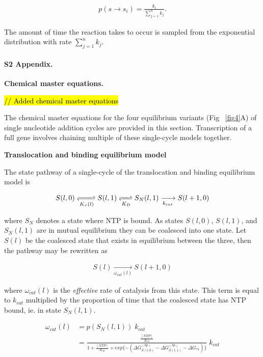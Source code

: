 \documentclass[10pt,letterpaper]{article}
\begin{document}
\begin{eqnarray}
    p(s\rightarrow s_i) = \frac{k_i}{\sum\limits_{j=1}^n k_j}.
\end{eqnarray}

The amount of time the reaction takes to occur is sampled from the exponential distribution with rate $\sum\limits_{j=1}^n k_j$. \\








\paragraph*{S2 Appendix.}
\label{S2_Appendix}
\textbf{ Chemical master equations.}

\textcolor{red}{\hl{// Added chemical master equations}}

The chemical master equations for the four equilibrium variants (Fig ~\ref{fig4}A) of single nucleotide addition cycles are provided in this section. Transcription of a full gene involves chaining multiple of these single-cycle models together.



\textbf{Translocation and binding equilibrium model} \par


The state pathway of a single-cycle of the translocation and binding equilibrium model is


\begin{eqnarray}
    S(l,0) \xrightleftharpoons[K_\tau(l)]{} S(l,1) \xrightleftharpoons[K_D]{} S_N(l,1) \xrightarrow[k_{cat}]{} S(l+1,0)
\end{eqnarray}


where $S_N$ denotes a state where NTP is bound. As states $S(l,0)$, $S(l,1)$, and $S_N(l,1)$ are in mutual equilibrium they can be coalesced into one state. Let $S(l)$ be the coalesced state that exists in equilibrium between the three, then the pathway may be rewritten as


\begin{eqnarray}
    S(l) \xrightarrow[\omega_{cat}(l)]{} S(l+1,0)
\end{eqnarray}

where $\omega_{cat}(l)$ is the \textit{effective} rate of catalysis from this state. This term is equal to $k_{cat}$ multiplied by the proportion of time that the coalesced state has NTP bound, ie. in state $S_N(l,1)$.


\begin{align}
    \omega_{cat}(l) &= p( S_N(l,1) ) \; k_{cat} \\
    &= \frac{ \frac{[NTP]}{K_D} }{ 1 + \frac{[NTP]}{K_D} + exp\{ -(\Delta G^{(bp)}_{S(l,0)} -  \Delta G^{(bp)}_{S(l,1)} - \Delta G _{\tau 1} ) \} } \; k_{cat}
\end{align}
\end{document}
